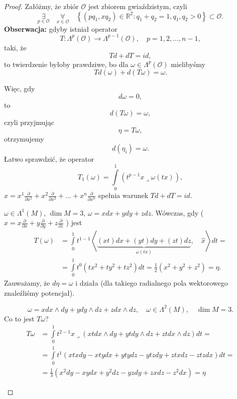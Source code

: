 \documentclass[../main.tex]{subfiles}
\begin{document}
\begin{proof}
    Załóżmy, że zbiór $\mathcal{O}$ jest zbiorem gwiaździstym, czyli
    \[
        \underset{p\in\mathcal{O}}{\exists}\quad \underset{x\in \mathcal{O}}{\forall}\quad \left\{(pq_1, xq_2)\in \mathbb{R}^2: q_1+q_2 = 1, q_1,q_2 > 0\right\}\subset\mathcal{O}
    .\]
\textbf{Obserwacja:} gdyby istniał operator
    \[
        T: \Lambda^p(\mathcal{O}) \to \Lambda^{p-1}(\mathcal{O}),\quad p = 1,2,\ldots,n-1,
    \]
    taki, że
\[
Td + dT = id
,\]
to twierdzenie byłoby prawdziwe, bo dla $\omega\in \Lambda^p(\mathcal{O})$ mielibyśmy
    \[
        Td(\omega) + d(T\omega) = \omega
    .\]

    Więc, gdy
    \[
        d\omega = 0
    ,\]
to
    \[
        d(T\omega) = \omega
    ,\]
    czyli przyjmując
 \[
\eta = T\omega
,\]
otrzymujemy
\[
    d(\eta_i) = \omega
.\]
Łatwo sprawdzić, że operator
\[
    T_1(\omega) = \int\limits_0^1\left(t^{p-1}x \lrcorner \omega(tx)\right)
,\]
$x = x^1 \frac{\partial }{\partial x^1} + x^2 \frac{\partial }{\partial x^2} + \ldots + x^n \frac{\partial }{\partial x^n}$ spełnia warunek $Td + dT = id$.
 \begin{przyklad}
     $\omega \in \Lambda^1(M)$, $\dim M = 3$, $\omega = xdx + ydy + zdz$. Wówczas, gdy ($\hat{x} = x \frac{\partial }{\partial x} + y \frac{\partial }{\partial y} + z \frac{\partial }{\partial z}$ ) jest
     \begin{align*}
         T(\omega) &= \int\limits_0^1 t^{1-1} \left<\underbrace{(xt)dx + (yt)dy + (zt)dz}_{\omega(tx)},\quad \hat{x} \right>dt = \\
         &= \int\limits_0^1t^0\left( tx^2 + ty^2 + tz^2 \right) dt = \frac{1}{2}\left( x^2 + y^2 + z^2 \right) = \eta.
     \end{align*}
     Zauważamy, że $d\eta = \omega$ i działa (dla takiego radialnego pola wektorowego znaleźliśmy potencjał).
\end{przyklad}
\begin{przyklad}
    \[
        \omega = xdx\land dy + ydy\land dz + zdx\land dz,\quad \omega\in \Lambda^2(M),\quad \dim M = 3.
    \]
    Co to jest $T\omega$?
    \begin{align*}
        T\omega &= \int\limits_0^1t^{2-1} x \lrcorner \left( xt dx\land dy + yt dy\land dz + zt dx\land dz \right) dt = \\
        &= \int\limits_0^1 t^1\left( xtx dy - xt ydx + yt ydz - ytzdy + ztxdz - ztzdx \right)dt = \\
        &= \frac{1}{3}\left( x^2dy - xydx + y^2dz - yzdy + zxdz - z^2dx \right) = \eta

\end{align*}
\end{przyklad}
\end{proof}
\end{document}
